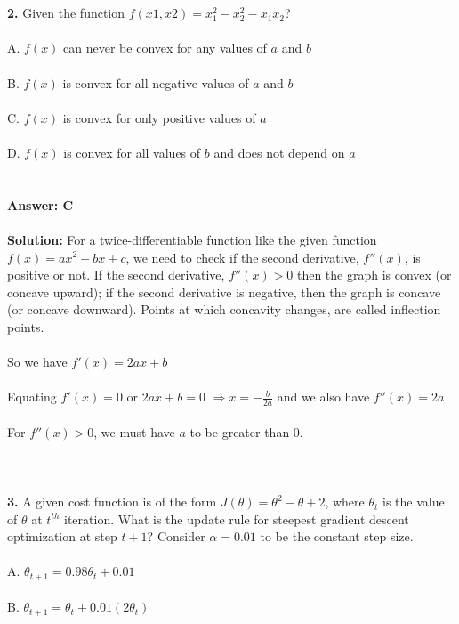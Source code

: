 \documentclass[prl,twocolumn,showpacs,preprintnumbers,superscriptaddress]{revtex4}
\theoremstyle{plain}
\theoremstyle{definition}
\begin{document}
\begin{widetext}
\\
\\
\textbf{2.} Given the function $f(x1,x2) = x_{1}^2 - x_{2}^2 - x_{1}x_{2}$?
\\
\\
\noindent A. $f(x)$ can never be convex for any values of $a$ and $b$\\
\\
B. $f(x)$ is convex for all negative values of $a$ and $b$\\
\\
C. $f(x)$ is convex for only positive values of $a$\\
\\
D. $f(x)$ is convex for all values of $b$ and does not depend on $a$
\\
\\
\\
\textbf{Answer: C}
\\
\\
\textbf{Solution:}
For a twice-differentiable function like the given function $f(x) = ax^2 + bx + c$, we need to check if the second derivative, $f''(x)$, is positive or not. If the second derivative, $f''(x) > 0$ then the graph is convex (or concave upward); if the second
derivative is negative, then the graph is concave (or concave downward). Points at which
concavity changes, are called inflection points.
\\
\\
So we have $f'(x) = 2ax + b$
\\
\\
Equating $f'(x) = 0$ or $2ax + b = 0$ $\Longrightarrow x = -\frac{b}{2a}$ 
and we also have $f''(x) = 2a$
\\
\\
For $f''(x) > 0$, we must have $a$ to be greater than $0$. 
\\
\\
\\
\\
\textbf{3.} A given cost function is of the form $J(\theta) = \theta^2 - \theta + 2$, where $\theta_{t}$ is the value of $\theta$ at $t^{th}$ iteration. What is the  update rule  for steepest gradient descent optimization at step $t + 1$? Consider $\alpha = 0.01$ to be the constant step size.
\\
\\
\noindent A. $\theta_{t + 1} = 0.98\theta_{t} + 0.01$\\
\\
B. $\theta_{t + 1} = \theta_{t} + 0.01(2\theta_{t})$\\

\end{widetext}
\end{document}
